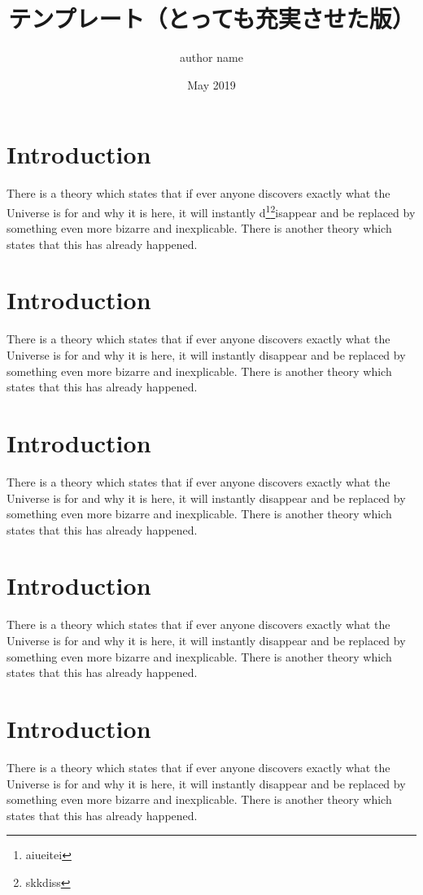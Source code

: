 \documentclass[a4paper,10pt,twoside,uplatex,dvipdfmx]{jsarticle}
\title{テンプレート（とっても充実させた版）}
\author{author name}
\date{May 2019}
\begin{document}
\maketitle\thispagestyle{fancy}

\section{Introduction}
There is a theory which states that if ever anyone discovers exactly what the Universe is for and why it is here, it will instantly d\footnote{aiueitei}\footnote{skkdiss}isappear and be replaced by something even more {\Large bizarre and inexplicable}.
There is another theory which states that this has already happened.

\section{Introduction}
There is a theory which states that if ever anyone discovers exactly what the Universe is for and why it is here, it will instantly disappear and be replaced by something even more bizarre and inexplicable.
There is another theory which states that this has already happened.

\section{Introduction}
There is a theory which states that if ever anyone discovers exactly what the Universe is for and why it is here, it will instantly disappear and be replaced by something even more bizarre and inexplicable.
There is another theory which states that this has already happened.

\section{Introduction}
There is a theory which states that if ever anyone discovers exactly what the Universe is for and why it is here, it will instantly disappear and be replaced by something even more bizarre and inexplicable.
There is another theory which states that this has already happened.

\section{Introduction}
There is a theory which states that if ever anyone discovers exactly what the Universe is for and why it is here, it will instantly disappear and be replaced by something even more bizarre and inexplicable.
There is another theory which states that this has already happened.
\end{document}
